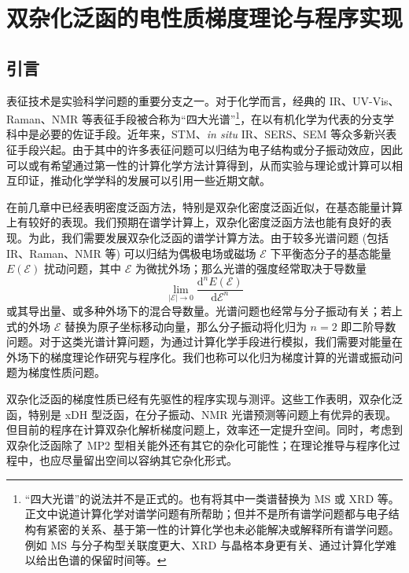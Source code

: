 
\chapter{双杂化泛函的电性质梯度理论与程序实现}
\label{sec.3.title}

\section{引言}

表征技术是实验科学问题的重要分支之一。对于化学而言，经典的 IR、UV-Vis、Raman、NMR 等表征手段被合称为“四大光谱”\footnote{“四大光谱”的说法并不是正式的。也有将其中一类谱替换为 MS 或 XRD 等。正文中说道计算化学对谱学问题有所帮助；但并不是所有谱学问题都与电子结构有紧密的关系、基于第一性的计算化学也未必能解决或解释所有谱学问题。例如 MS 与分子构型关联度更大、XRD 与晶格本身更有关、通过计算化学难以给出色谱的保留时间等。}，在以有机化学为代表的分支学科中是必要的佐证手段。近年来，STM、\emph{in situ} IR、SERS、SEM 等众多新兴表征手段兴起。由于其中的许多表征问题可以归结为电子结构或分子振动效应，因此可以或有希望通过第一性的计算化学方法计算得到，从而实验与理论或计算可以相互印证，推动化学学科的发展\alert{可以引用一些近期文献}。

在前几章中已经表明密度泛函方法，特别是双杂化密度泛函近似，在基态能量计算上有较好的表现。我们预期在谱学计算上，双杂化密度泛函方法也能有良好的表现。为此，我们需要发展双杂化泛函的谱学计算方法。由于较多光谱问题 (包括 IR、Raman、NMR 等) 可以归结为偶极电场或磁场 $\pmb{\mathcal{E}}$ 下平衡态分子的基态能量 $E(\pmb{\mathcal{E}})$ 扰动问题，其中 $\pmb{\mathcal{E}}$ 为微扰外场；那么光谱的强度经常取决于导数量
\begin{equation}
  \lim_{|\pmb{\mathcal{E}}| \rightarrow 0} \frac{\mathrm{d}^n E(\pmb{\mathcal{E}})}{\mathrm{d} \pmb{\mathcal{E}}^n}
\end{equation}
或其导出量、或多种外场下的混合导数量。光谱问题也经常与分子振动有关；若上式的外场 $\pmb{\mathcal{E}}$ 替换为原子坐标移动向量，那么分子振动将化归为 $n = 2$ 即二阶导数问题。对于这类光谱计算问题，为通过计算化学手段进行模拟，我们需要对能量在外场下的梯度理论作研究与程序化。我们也称可以化归为梯度计算的光谱或振动问题为\textsf{梯度性质}问题。

双杂化泛函的梯度性质已经有先驱性的程序实现与测评\cite{Neese-Grimme.JCP.2007, Biczysko-Barone.JCTC.2010, Su-Xu.JCC.2013, Stoychev-Neese.JCTC.2018, Gu-Xu.JCTC.2021, Yan-Xu.JCTC.2022}。这些工作表明，双杂化泛函，特别是 xDH 型泛函，在分子振动、NMR 光谱预测等问题上有优异的表现。但目前的程序在计算双杂化解析梯度问题上，效率还一定提升空间。同时，考虑到双杂化泛函除了 MP2 型相关能外还有其它的杂化可能性；在理论推导与程序化过程中，也应尽量留出空间以容纳其它杂化形式。

